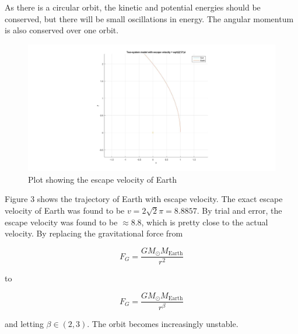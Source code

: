 \documentclass[10pt,a4paper]{article}
\begin{document}
\noindent As there is a circular orbit, the kinetic and potential energies should be conserved, but there will be small oscillations in energy. The angular momentum is also conserved over one orbit.\\
\begin{figure} [H]
\centerline{\includegraphics[scale=0.2]{escapevelocity.jpg}}
\caption{Plot showing the escape velocity of Earth}
\end{figure}


\noindent Figure 3 shows the trajectory of Earth with escape velocity. The exact escape velocity of Earth was found to be $v=2\sqrt{2}\pi=8.8857$. By trial and error, the escape velocity was found to be $\approx 8.8$, which is pretty close to the actual velocity. By replacing the gravitational force from

$$
F_G=\frac{GM_{\odot}M_{\mathrm{Earth}}}{r^2}
$$

to

$$
F_G=\frac{GM_{\odot}M_{\mathrm{Earth}}}{r^{\beta}}
$$

\noindent and letting $\beta\in(2,3)$. The orbit becomes increasingly unstable. \\
\end{document}
